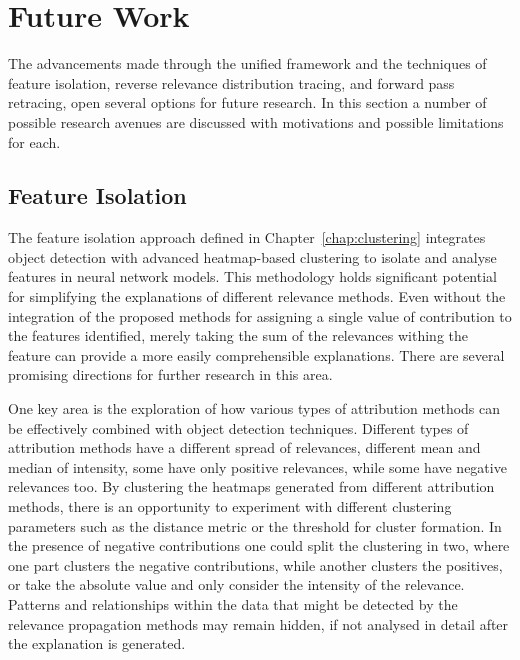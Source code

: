 \section{Future Work}
The advancements made through the unified framework and the techniques of feature isolation, reverse relevance distribution tracing, and forward pass retracing, open several options for future research. In this section a number of possible research avenues are discussed with motivations and possible limitations for each.

\subsection{Feature Isolation}
The feature isolation approach defined in Chapter~\ref{chap:clustering} integrates object detection with advanced heatmap-based clustering to isolate and analyse features in neural network models. This methodology holds significant potential for simplifying the explanations of different relevance methods. Even without the integration of the proposed methods for assigning a single value of contribution to the features identified, merely taking the sum of the relevances withing the feature can provide a more easily comprehensible explanations. There are several promising directions for further research in this area.

One key area is the exploration of how various types of attribution methods can be effectively combined with object detection techniques. Different types of attribution methods have a different spread of relevances, different mean and median of intensity, some have only positive relevances, while some have negative relevances too. By clustering the heatmaps generated from different attribution methods, there is an opportunity to experiment with different clustering parameters such as the distance metric or the threshold for cluster formation. In the presence of negative contributions one could split the clustering in two, where one part clusters the negative contributions, while another clusters the positives, or take the absolute value and only consider the intensity of the relevance. Patterns and relationships within the data that might be detected by the relevance propagation methods may remain hidden, if not analysed in detail after the explanation is generated. 

